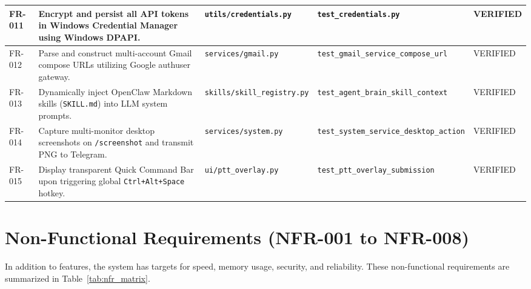 \documentclass[12pt,letterpaper,oneside]{report}
\begin{document}
\begin{table}[H]
\begin{tabularx}{\textwidth}{|l|X|l|l|l|}
FR-011 & Encrypt and persist all API tokens in Windows Credential Manager using Windows DPAPI. & \texttt{utils/credentials.py} & \texttt{test\_credentials.py} & VERIFIED\\ \hline
FR-012 & Parse and construct multi-account Gmail compose URLs utilizing Google authuser gateway. & \texttt{services/gmail.py} & \texttt{test\_gmail\_service\_compose\_url} & VERIFIED\\ \hline
FR-013 & Dynamically inject OpenClaw Markdown skills (\texttt{SKILL.md}) into LLM system prompts. & \texttt{skills/skill\_registry.py} & \texttt{test\_agent\_brain\_skill\_context} & VERIFIED\\ \hline
FR-014 & Capture multi-monitor desktop screenshots on \texttt{/screenshot} and transmit PNG to Telegram. & \texttt{services/system.py} & \texttt{test\_system\_service\_desktop\_action} & VERIFIED\\ \hline
FR-015 & Display transparent Quick Command Bar upon triggering global \texttt{Ctrl+Alt+Space} hotkey. & \texttt{ui/ptt\_overlay.py} & \texttt{test\_ptt\_overlay\_submission} & VERIFIED\\ \hline
\end{tabularx}
\end{table}

\section{Non-Functional Requirements (NFR-001 to NFR-008)}
In addition to features, the system has targets for speed, memory usage, security, and reliability. These non-functional requirements are summarized in Table~\ref{tab:nfr_matrix}.
\end{document}
